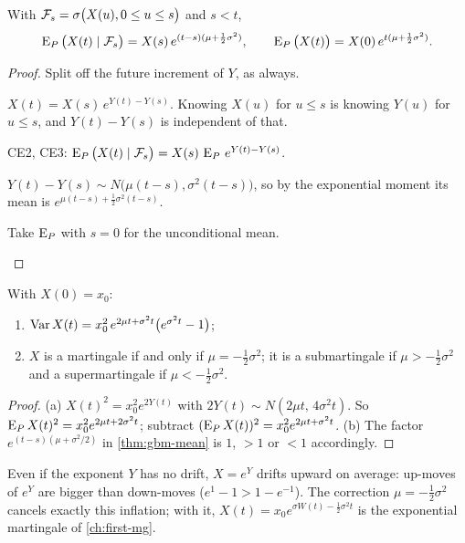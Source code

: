 \begin{theorem}
\label{thm:gbm-mean}
With $\mathcal F_s=\sigma\big(X(u),0\le u\le s\big)$ and $s<t$,
\[
  \operatorname{E}_P\big(X(t)\mid\mathcal F_s\big)=X(s)\,e^{(t-s)(\mu+\frac12\sigma^2)},\qquad
  \operatorname{E}_P\big(X(t)\big)=X(0)\,e^{t(\mu+\frac12\sigma^2)} .
\]
\end{theorem}
\begin{proof}
Split off the future increment of $Y$, as always.
\begin{steps}
  \item $X(t)=X(s)\,e^{Y(t)-Y(s)}$. Knowing $X(u)$ for $u\le s$ is knowing $Y(u)$ for $u\le s$, and $Y(t)-Y(s)$ is independent of that.
  \item CE2, CE3: $\operatorname{E}_P\big(X(t)\mid\mathcal F_s\big)=X(s)\,\operatorname{E}_P\,e^{Y(t)-Y(s)}$.
  \item $Y(t)-Y(s)\sim N\big(\mu(t-s),\sigma^2(t-s)\big)$, so by the exponential moment its mean is $e^{\mu(t-s)+\frac12\sigma^2(t-s)}$.
  \item Take $\operatorname{E}_P$ with $s=0$ for the unconditional mean. \qedhere
\end{steps}
\end{proof}

\begin{result}
\label{res:gbm-var}
With $X(0)=x_0$:
\begin{enumerate}[label=(\alph*)]
  \item $\operatorname{Var} X(t)=x_0^2\,e^{2\mu t+\sigma^2t}\big(e^{\sigma^2t}-1\big)$;
  \item $X$ is a martingale if and only if $\mu=-\frac12\sigma^2$; it is a submartingale if $\mu>-\frac12\sigma^2$ and a supermartingale if $\mu<-\frac12\sigma^2$.
\end{enumerate}
\end{result}
\begin{proof}
(a) $X(t)^2=x_0^2e^{2Y(t)}$ with $2Y(t)\sim N(2\mu t,\,4\sigma^2t)$. So $\operatorname{E}_PX(t)^2=x_0^2e^{2\mu t+2\sigma^2t}$; subtract $(\operatorname{E}_PX(t))^2=x_0^2e^{2\mu t+\sigma^2t}$. (b) The factor $e^{(t-s)(\mu+\sigma^2/2)}$ in \cref{thm:gbm-mean} is $1$, $>1$ or $<1$ accordingly.
\end{proof}

\begin{intuition}
Even if the exponent $Y$ has no drift, $X=e^Y$ drifts upward on average: up-moves of $e^Y$ are bigger than down-moves ($e^{1}-1>1-e^{-1}$). The correction $\mu=-\frac12\sigma^2$ cancels exactly this inflation; with it, $X(t)=x_0e^{\sigma W(t)-\frac12\sigma^2t}$ is the exponential martingale of \cref{ch:first-mg}.
\end{intuition}

